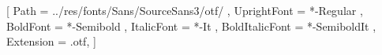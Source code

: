 \setsansfont{SourceSans3}
[
	Path = ../res/fonts/Sans/SourceSans3/otf/ ,
	UprightFont = *-Regular ,
	BoldFont = *-Semibold ,
	ItalicFont = *-It ,
	BoldItalicFont = *-SemiboldIt ,
	Extension = .otf,
]